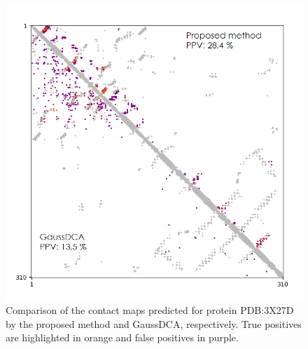     \begin{figure}[H]
        \begin{center}
            \includegraphics[width=\textwidth, keepaspectratio]{imgs/3X27D.png}
            \caption{Comparison of the contact maps predicted for protein PDB:3X27D
                by the proposed method and GaussDCA, respectively. True positives
                are highlighted in orange and false positives in purple.}
            \label{analysis_3X27D}
        \end{center}
    \end{figure}
